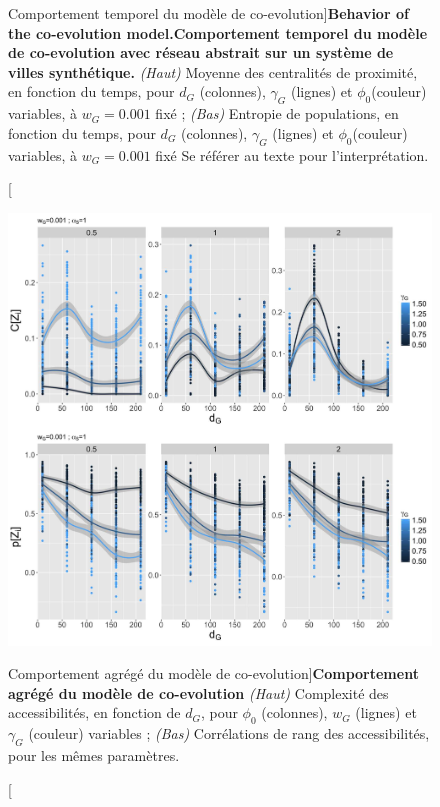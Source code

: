 \begin{figure}
\caption[Behavior of the co-evolution model][Comportement temporel du modèle de co-evolution]{\textbf{Behavior of the co-evolution model.}\label{fig:macrocoevol:behavior-time}}{\textbf{Comportement temporel du modèle de co-evolution avec réseau abstrait sur un système de villes synthétique.} \textit{(Haut)} Moyenne des centralités de proximité, en fonction du temps, pour $d_G$ (colonnes), $\gamma_G$ (lignes) et $\phi_0$(couleur) variables, à $w_G = 0.001$ fixé ; \textit{(Bas)} Entropie de populations, en fonction du temps, pour $d_G$ (colonnes), $\gamma_G$ (lignes) et $\phi_0$(couleur) variables, à $w_G = 0.001$ fixé Se référer au texte pour l'interprétation.\label{fig:macrocoevol:behavior-time}}
\end{figure}



\begin{figure}
\includegraphics[width=\linewidth]{Figures/Final/6-2-2-fig-macrocoevol-behavior-aggreg.jpg}
\caption[][Comportement agrégé du modèle de co-evolution]{}{\textbf{Comportement agrégé du modèle de co-evolution} \textit{(Haut)} Complexité des accessibilités, en fonction de $d_G$, pour $\phi_0$ (colonnes), $w_G$ (lignes) et $\gamma_G$ (couleur) variables ; \textit{(Bas)} Corrélations de rang des accessibilités, pour les mêmes paramètres.\label{fig:macrocoevol:behavior-aggreg}}
\end{figure}






